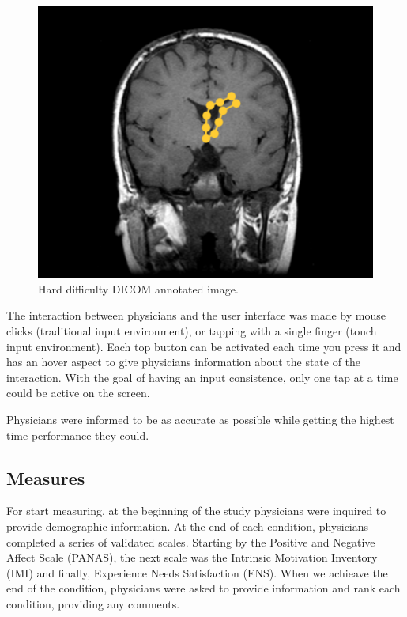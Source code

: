 \documentclass{sigchi}
\begin{document}
\begin{figure}[!h]
\centering
\includegraphics[width=0.9\columnwidth]{screen4}
\caption{Hard difficulty DICOM annotated image.}
\label{fig:fig6}
\end{figure}

The interaction between physicians and the user interface was made by mouse clicks (traditional input environment), or tapping with a single finger (touch input environment). Each top button can be activated each time you press it and has an hover aspect to give physicians information about the state of the interaction. With the goal of having an input consistence, only one tap at a time could be active on the screen.

Physicians were informed to be as accurate as possible while getting the highest time performance they could.

\subsection{Measures}

For start measuring, at the beginning of the study physicians were inquired to provide demographic information. At the end of each condition, physicians completed a series of validated scales. Starting by the Positive and Negative Affect Scale \cite{watson1999panas} (PANAS), the next scale was the Intrinsic Motivation Inventory \cite{ryan1982control} (IMI) and finally, Experience Needs Satisfaction \cite{broeck2010capturing} (ENS). When we achieave the end of the condition, physicians were asked to provide information and rank each condition, providing any comments.
\end{document}
